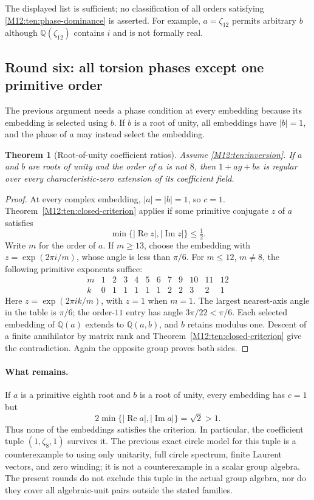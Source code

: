 \documentclass[11pt,a4paper,oneside]{report}
\newtheorem{theorem}{Theorem}[section]
\theoremstyle{definition}
\theoremstyle{remark}
\begin{document}
The displayed list is sufficient; no classification of all orders
satisfying \eqref{M12:ten:phase-dominance} is asserted. For example,
$a=\zeta_{12}$ permits arbitrary $b$ although
$\mathbb Q(\zeta_{12})$ contains $i$ and is not formally real.

\subsection{Round six: all torsion phases except one primitive order}

The previous argument needs a phase condition at every embedding
because its embedding is selected using $b$. If $b$ is a root of
unity, all embeddings have $|b|=1$, and the phase of $a$ may instead
select the embedding.

\begin{theorem}[Root-of-unity coefficient ratios]
\label{M12:ten:torsion-phases}
Assume \eqref{M12:ten:inversion}. If $a$ and $b$ are roots of unity and
the order of $a$ is not $8$, then $1+ag+bs$ is regular over every
characteristic-zero extension of its coefficient field.
\end{theorem}
\begin{proof}
At every complex embedding, $|a|=|b|=1$, so $c=1$.
Theorem~\ref{M12:ten:closed-criterion} applies if some primitive
conjugate $z$ of $a$ satisfies
\[
\min\{|\operatorname{Re}z|,|\operatorname{Im}z|\}\le\tfrac12.
\]
Write $m$ for the order of $a$. If $m\ge13$, choose the embedding
with $z=\exp(2\pi i/m)$, whose angle is less than $\pi/6$.
For $m\le12$, $m\ne8$, the following primitive exponents suffice:
\[
\begin{array}{c|rrrrrrrrrrr}
m&1&2&3&4&5&6&7&9&10&11&12\\
\hline
k&0&1&1&1&1&1&2&2&3&2&1
\end{array}
\]
Here $z=\exp(2\pi i k/m)$, with $z=1$ when $m=1$.
The largest nearest-axis angle in the table is $\pi/6$; the
order-$11$ entry has angle $3\pi/22<\pi/6$.
Each selected embedding of $\mathbb Q(a)$ extends to
$\mathbb Q(a,b)$, and $b$ retains modulus one. Descent of a finite
annihilator by matrix rank and Theorem~\ref{M12:ten:closed-criterion}
give the contradiction. Again the opposite group proves both
sides.
\end{proof}

\paragraph{What remains.}
If $a$ is a primitive eighth root and $b$ is a root of unity, every
embedding has $c=1$ but
\[
2\min\{|\operatorname{Re}a|,|\operatorname{Im}a|\}
=\sqrt2>1.
\]
Thus none of the embeddings satisfies the criterion. In particular,
the coefficient tuple $(1,\zeta_8,1)$ survives it. The previous
exact circle model for this tuple is a counterexample to using only
unitarity, full circle spectrum, finite Laurent vectors, and zero
winding; it is not a counterexample in a scalar group algebra.
The present rounds do not exclude this tuple in the actual group
algebra, nor do they cover all algebraic-unit pairs outside the
stated families.
\end{document}
